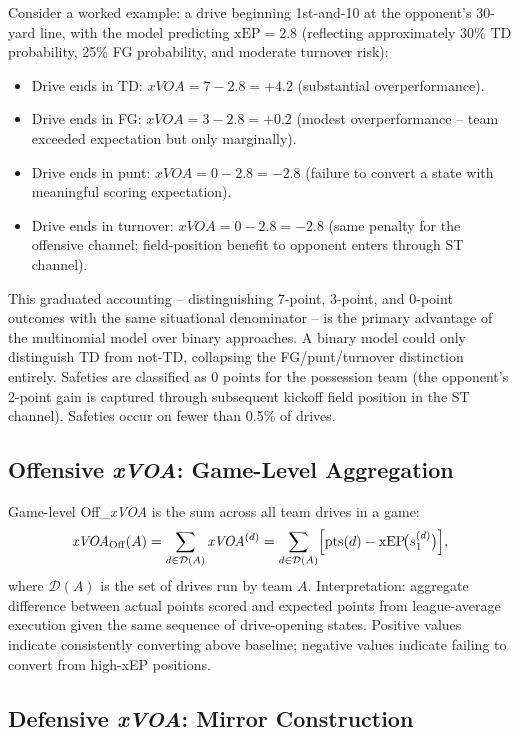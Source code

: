 \documentclass[12pt,a4paper]{article}
\newcommand{\xvoa}{\textit{xVOA}}
\begin{document}
Consider a worked example: a drive beginning 1st-and-10 at the opponent's 30-yard line, with the model predicting $\text{xEP} = 2.8$ (reflecting approximately 30\% TD probability, 25\% FG probability, and moderate turnover risk):
\begin{itemize}
  \item Drive ends in TD: $\xvoa{} = 7 - 2.8 = +4.2$ (substantial overperformance).
  \item Drive ends in FG: $\xvoa{} = 3 - 2.8 = +0.2$ (modest overperformance -- team exceeded expectation but only marginally).
  \item Drive ends in punt: $\xvoa{} = 0 - 2.8 = -2.8$ (failure to convert a state with meaningful scoring expectation).
  \item Drive ends in turnover: $\xvoa{} = 0 - 2.8 = -2.8$ (same penalty for the offensive channel; field-position benefit to opponent enters through ST channel).
\end{itemize}
This graduated accounting -- distinguishing 7-point, 3-point, and 0-point outcomes with the same situational denominator -- is the primary advantage of the multinomial model over binary approaches. A binary model could only distinguish TD from not-TD, collapsing the FG/punt/turnover distinction entirely. Safeties are classified as 0 points for the possession team (the opponent's 2-point gain is captured through subsequent kickoff field position in the ST channel). Safeties occur on fewer than 0.5\% of drives.

\subsection{Offensive \xvoa{}: Game-Level Aggregation}

Game-level Off\_\xvoa{} is the sum across all team drives in a game:
\begin{equation}
  \label{eq:xvoa-off}
  \xvoa{}_{\mathrm{Off}}(A) = \sum_{d \in \mathcal{D}(A)} \xvoa{}^{(d)}
    = \sum_{d \in \mathcal{D}(A)}
      \Bigl[\mathrm{pts}(d) - \mathrm{xEP}\!\bigl(s_{1}^{(d)}\bigr)\Bigr],
\end{equation}
where $\mathcal{D}(A)$ is the set of drives run by team $A$. Interpretation: aggregate difference between actual points scored and expected points from league-average execution given the same sequence of drive-opening states. Positive values indicate consistently converting above baseline; negative values indicate failing to convert from high-xEP positions.

\subsection{Defensive \xvoa{}: Mirror Construction}
\end{document}
